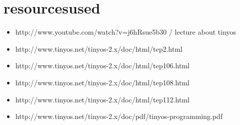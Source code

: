 
\chapter{resourcesused} \label{chapter:resourcesused}

\begin{itemize}
 \item http://www.youtube.com/watch?v=j6hRsue5b30 / lecture about tinyos
 \item http://www.tinyos.net/tinyos-2.x/doc/html/tep2.html
 \item http://www.tinyos.net/tinyos-2.x/doc/html/tep106.html
 \item http://www.tinyos.net/tinyos-2.x/doc/html/tep108.html
 \item http://www.tinyos.net/tinyos-2.x/doc/html/tep112.html
 \item http://www.tinyos.net/tinyos-2.x/doc/pdf/tinyos-programming.pdf
\end{itemize}


